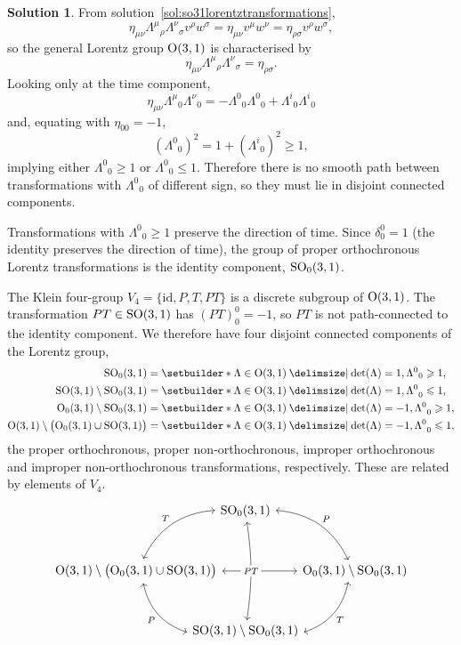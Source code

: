 \documentclass[11pt, a4paper]{report}
\theoremstyle{definition}
\newtheorem{sol}{Solution}[part]
\renewcommand{\leq}{\leqslant}
\renewcommand{\geq}{\geqslant}
\renewcommand*{\O}{\ensuremath\text{O}}
\newcommand*{\SO}{\ensuremath\text{SO}}
\begin{document}
\begin{sol}

From solution~\ref{sol:so31lorentztransformations},
\[
    \eta_{\mu\nu} {\Lambda^\mu}_\rho {\Lambda^\nu}_\sigma v^\rho w^\sigma
        = \eta_{\mu\nu} v^\mu w^\nu
        = \eta_{\rho \sigma} v^\rho w^\sigma,
\]
so the general Lorentz group $\O(3, 1)$ is characterised by
\[
    \eta_{\mu\nu} {\Lambda^\mu}_\rho {\Lambda^\nu}_\sigma = \eta_{\rho\sigma}.
\]
Looking only at the time component,
\[
    \eta_{\mu\nu} {\Lambda^\mu}_0 {\Lambda^\nu}_0
        = -{\Lambda^0}_0 {\Lambda^0}_0 + {\Lambda^i}_0 {\Lambda^i}_0
\]
and, equating with $\eta_{00} = -1$,
\[
    {({\Lambda^0}_0)}^2 = 1 + {({\Lambda^i}_0)}^2 \geq 1,
\]
implying either ${\Lambda^0}_0 \geq 1$ or ${\Lambda^0}_0 \leq 1$.
Therefore there is no smooth path between transformations with ${\Lambda^0}_0$ of different sign, so they must lie in disjoint connected components.

Transformations with ${\Lambda^0}_0 \geq 1$ preserve the direction of time.
Since $\delta_0^0 = 1$ (the identity preserves the direction of time), the group of proper orthochronous Lorentz transformations is the identity component, $\SO_0(3, 1)$.

The Klein four-group $V_4 = \{\text{id}, P, T, PT\}$ is a discrete subgroup of $\O(3, 1)$. The transformation $PT \in \SO(3, 1)$ has ${(PT)}^0_0 = -1$, so $PT$ is not path-connected to the identity component.
We therefore have four disjoint connected components of the Lorentz group,
\begin{align*}
    \SO_0(3, 1) &= \setbuilder*{\Lambda \in \O(3, 1) \given \det(\Lambda) = 1, {\Lambda^0}_0 \geq 1}, \\
    \SO(3, 1) \setminus \SO_0(3, 1)
        &= \setbuilder*{\Lambda \in \O(3, 1)  \given {\det(\Lambda) = 1, \Lambda^0}_0 \leq 1}, \\
    \O_0(3, 1) \setminus \SO_0(3, 1)
        &= \setbuilder*{\Lambda \in \O(3, 1)  \given {\det(\Lambda) = -1, \Lambda^0}_0 \geq 1}, \\
    \O(3, 1) \setminus \bigl( \O_0(3, 1) \cup \SO(3, 1) \bigr)
        &= \setbuilder*{\Lambda \in \O(3, 1)  \given {\det(\Lambda) = -1, \Lambda^0}_0 \leq 1},
\end{align*}
the proper orthochronous, proper non-orthochronous, improper orthochronous and improper non-orthochronous transformations, respectively.
These are related by elements of $V_4$.
\[
    \begin{tikzcd}[row sep=7ex, column sep={8.8em, between origins},
                   every arrow/.append style=leftrightarrow]
        & \SO_0(3, 1) \dlar[bend right=30, swap]{T}
                      \drar[bend left=30]{P} & \\
        \O(3, 1) \setminus \bigl( \O_0(3, 1) \cup \SO(3, 1) \bigr)
                \drar[bend right=30, swap]{P}
                \ar{rr}
            & & \O_0(3, 1) \setminus \SO_0(3, 1)
                \dlar[bend left=30]{T} \\
        & \SO(3, 1) \setminus \SO_0(3, 1) \ar[crossing over, bend right=8, labels=description]{uu}{PT} &
    \end{tikzcd}
\]

\end{sol}
\end{document}
